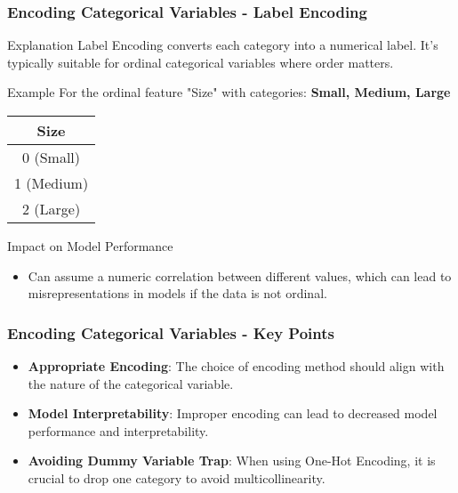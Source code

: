 \documentclass{beamer}
\begin{document}
\begin{frame}[fragile]
    \frametitle{Encoding Categorical Variables - Label Encoding}
    \begin{block}{Explanation}
        Label Encoding converts each category into a numerical label. It's typically suitable for ordinal categorical variables where order matters.
    \end{block}
    \begin{block}{Example}
        For the ordinal feature "Size" with categories: \textbf{Small, Medium, Large}
        \begin{table}[]
            \centering
            \begin{tabular}{|c|}
                \hline
                \textbf{Size} \\ \hline
                0 (Small) \\ \hline
                1 (Medium) \\ \hline
                2 (Large) \\ \hline
            \end{tabular}
        \end{table}
    \end{block}
    \begin{block}{Impact on Model Performance}
        \begin{itemize}
            \item Can assume a numeric correlation between different values, which can lead to misrepresentations in models if the data is not ordinal.
        \end{itemize}
    \end{block}
\end{frame}

\begin{frame}[fragile]
    \frametitle{Encoding Categorical Variables - Key Points}
    \begin{itemize}
        \item \textbf{Appropriate Encoding}: The choice of encoding method should align with the nature of the categorical variable.
        \item \textbf{Model Interpretability}: Improper encoding can lead to decreased model performance and interpretability.
        \item \textbf{Avoiding Dummy Variable Trap}: When using One-Hot Encoding, it is crucial to drop one category to avoid multicollinearity.
    \end{itemize}
\end{frame}
\end{document}
